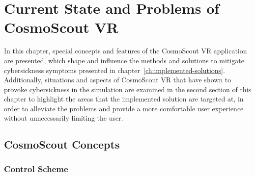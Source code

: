 \chapter{Current State and Problems of CosmoScout VR}\label{ch:current-state-and-problems-of-cosmoscout}

In this chapter, special concepts and features of the CosmoScout VR application are presented, which shape and
influence the methods and solutions to mitigate cybersickness symptoms presented in
chapter~\ref{ch:implemented-solutions}.
\\
Additionally, situations and aspects of CosmoScout VR that have shown to provoke cybersickness in the simulation are
examined in the second section of this chapter to highlight the areas that the implemented solution are targeted at,
in order to alleviate the problems and provide a more comfortable user experience without unnecessarily limiting the
user.

\section{CosmoScout Concepts}\label{sec:cosmoscout-concepts}
\subsection{Control Scheme}\label{subsec:control-scheme}

